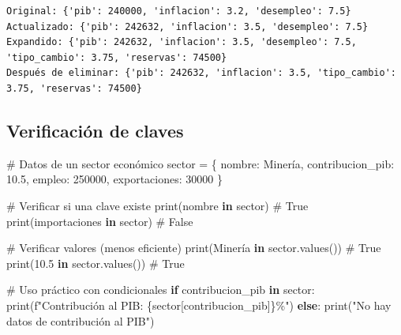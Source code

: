 \documentclass[
  doc,
  floatsintext,
  longtable,
  a4paper,
  nolmodern,
  notxfonts,
  notimes,
  12pt,
  colorlinks=true,linkcolor=blue,citecolor=blue,urlcolor=blue]{apa7}
\newenvironment{Shaded}{\begin{snugshade}}{\end{snugshade}}
\newcommand{\BuiltInTok}[1]{\textcolor[rgb]{0.00,0.23,0.31}{#1}}
\newcommand{\CommentTok}[1]{\textcolor[rgb]{0.37,0.37,0.37}{#1}}
\newcommand{\ControlFlowTok}[1]{\textcolor[rgb]{0.00,0.23,0.31}{\textbf{#1}}}
\newcommand{\DecValTok}[1]{\textcolor[rgb]{0.68,0.00,0.00}{#1}}
\newcommand{\FloatTok}[1]{\textcolor[rgb]{0.68,0.00,0.00}{#1}}
\newcommand{\KeywordTok}[1]{\textcolor[rgb]{0.00,0.23,0.31}{\textbf{#1}}}
\newcommand{\NormalTok}[1]{\textcolor[rgb]{0.00,0.23,0.31}{#1}}
\newcommand{\OperatorTok}[1]{\textcolor[rgb]{0.37,0.37,0.37}{#1}}
\newcommand{\SpecialCharTok}[1]{\textcolor[rgb]{0.37,0.37,0.37}{#1}}
\newcommand{\SpecialStringTok}[1]{\textcolor[rgb]{0.13,0.47,0.30}{#1}}
\newcommand{\StringTok}[1]{\textcolor[rgb]{0.13,0.47,0.30}{#1}}
\begin{document}
\begin{verbatim}
Original: {'pib': 240000, 'inflacion': 3.2, 'desempleo': 7.5}
Actualizado: {'pib': 242632, 'inflacion': 3.5, 'desempleo': 7.5}
Expandido: {'pib': 242632, 'inflacion': 3.5, 'desempleo': 7.5, 'tipo_cambio': 3.75, 'reservas': 74500}
Después de eliminar: {'pib': 242632, 'inflacion': 3.5, 'tipo_cambio': 3.75, 'reservas': 74500}
\end{verbatim}

\subsection{Verificación de claves}\label{verificaciuxf3n-de-claves}

\begin{Shaded}
\begin{Highlighting}[]
\CommentTok{\# Datos de un sector económico}
\NormalTok{sector }\OperatorTok{=}\NormalTok{ \{}
    \StringTok{\textquotesingle{}nombre\textquotesingle{}}\NormalTok{: }\StringTok{\textquotesingle{}Minería\textquotesingle{}}\NormalTok{,}
    \StringTok{\textquotesingle{}contribucion\_pib\textquotesingle{}}\NormalTok{: }\FloatTok{10.5}\NormalTok{,}
    \StringTok{\textquotesingle{}empleo\textquotesingle{}}\NormalTok{: }\DecValTok{250000}\NormalTok{,}
    \StringTok{\textquotesingle{}exportaciones\textquotesingle{}}\NormalTok{: }\DecValTok{30000}
\NormalTok{\}}

\CommentTok{\# Verificar si una clave existe}
\BuiltInTok{print}\NormalTok{(}\StringTok{\textquotesingle{}nombre\textquotesingle{}} \KeywordTok{in}\NormalTok{ sector)          }\CommentTok{\# True}
\BuiltInTok{print}\NormalTok{(}\StringTok{\textquotesingle{}importaciones\textquotesingle{}} \KeywordTok{in}\NormalTok{ sector)   }\CommentTok{\# False}

\CommentTok{\# Verificar valores (menos eficiente)}
\BuiltInTok{print}\NormalTok{(}\StringTok{\textquotesingle{}Minería\textquotesingle{}} \KeywordTok{in}\NormalTok{ sector.values())  }\CommentTok{\# True}
\BuiltInTok{print}\NormalTok{(}\FloatTok{10.5} \KeywordTok{in}\NormalTok{ sector.values())       }\CommentTok{\# True}

\CommentTok{\# Uso práctico con condicionales}
\ControlFlowTok{if} \StringTok{\textquotesingle{}contribucion\_pib\textquotesingle{}} \KeywordTok{in}\NormalTok{ sector:}
    \BuiltInTok{print}\NormalTok{(}\SpecialStringTok{f"Contribución al PIB: }\SpecialCharTok{\{}\NormalTok{sector[}\StringTok{\textquotesingle{}contribucion\_pib\textquotesingle{}}\NormalTok{]}\SpecialCharTok{\}}\SpecialStringTok{\%"}\NormalTok{)}
\ControlFlowTok{else}\NormalTok{:}
    \BuiltInTok{print}\NormalTok{(}\StringTok{"No hay datos de contribución al PIB"}\NormalTok{)}
\end{Highlighting}
\end{Shaded}
\end{document}

